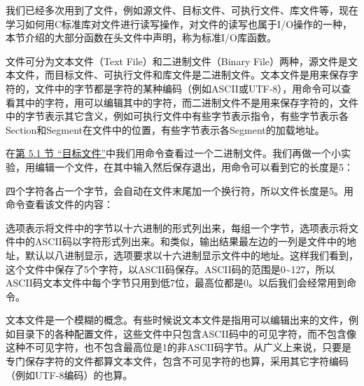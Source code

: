 我们已经多次用到了文件，例如源文件、目标文件、可执行文件、库文件等，现在学习如何用C标准库对文件进行读写操作，对文件的读写也属于I/\BookSplit{}O操作的一种，本节介绍的大部分函数在头文件中声明，称为标准I/\BookSplit{}O库函数。



文件可分为文本文件（Text File）和二进制文件（Binary File）两种，源文件是文本文件，而目标文件、可执行文件和库文件是二进制文件。文本文件是用来保存字符的，文件中的字节都是字符的某种编码（例如ASCII或UTF-8），用命令可以查看其中的字符，用可以编辑其中的字符，而二进制文件不是用来保存字符的，文件中的字节表示其它含义，例如可执行文件中有些字节表示指令，有些字节表示各Section和Segment在文件中的位置，有些字节表示各Segment的加载地址。



在\hyperlink{db.ch18s05.id2770854}{第 5.\BookSplit{}1 节 “目标文件”}中我们用命令查看过一个二进制文件。我们再做一个小实验，用编辑一个文件，在其中输入然后保存退出，用命令可以看到它的长度是5：




四个字符各占一个字节，会自动在文件末尾加一个换行符，所以文件长度是5。用命令查看该文件的内容：




选项表示将文件中的字节以十六进制的形式列出来，每组一个字节，选项表示将文件中的ASCII码以字符形式列出来。和类似，输出结果最左边的一列是文件中的地址，默认以八进制显示，选项要求以十六进制显示文件中的地址。这样我们看到，这个文件中保存了5个字符，以ASCII码保存。ASCII码的范围是0\textasciitilde{}\BookSplit{}127，所以ASCII码文本文件中每个字节只用到低7位，最高位都是0。以后我们会经常用到命令。



文本文件是一个模糊的概念。有些时候说文本文件是指用可以编辑出来的文件，例如目录下的各种配置文件，这些文件中只包含ASCII码中的可见字符，而不包含像这种不可见字符，也不包含最高位是1的非ASCII码字节。从广义上来说，只要是专门保存字符的文件都算文本文件，包含不可见字符的也算，采用其它字符编码（例如UTF-8编码）的也算。


